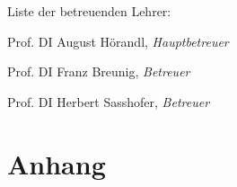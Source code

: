 \documentclass[a4paper,ngerman,naustrian,DIV=12,BCOR=1cm]{scrbook}
\begin{document}
\vspace{10mm}


\noindent Liste der betreuenden Lehrer:

Prof. DI August Hörandl, \textit{Hauptbetreuer}

Prof. DI Franz Breunig, \textit{Betreuer}

Prof. DI Herbert Sasshofer, \textit{Betreuer}

\vspace{10mm}

\renewcommand*{\chapterpagestyle}{fancy}
\cleardoublepage{}
\tableofcontents{}
\cleardoublepage{}
\listoftables
\cleardoublepage{}
\listoffigures

\cleardoublepage{}

\pagestyle{fancy}
\thispagestyle{fancy}












\renewcommand{\kapitelautor}{}

\appendix


\chapter{Anhang\label{appendix}}


\cleardoublepage
{}


\label{projectfolder}

\end{document}
